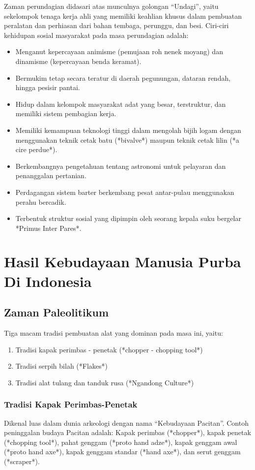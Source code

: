 \documentclass[12pt, a4paper]{article}
\begin{document}
Zaman perundagian didasari atas munculnya golongan ``Undagi'', yaitu sekelompok tenaga kerja ahli yang memiliki keahlian khusus dalam pembuatan peralatan dan perhiasan dari bahan tembaga, perunggu, dan besi. Ciri-ciri kehidupan sosial masyarakat pada masa perundagian adalah:
\begin{itemize}
	\item Menganut kepercayaan animisme (pemujaan roh nenek moyang) dan dinamisme (kepercayaan benda keramat).
	\item Bermukim tetap secara teratur di daerah pegunungan, dataran rendah, hingga pesisir pantai.
	\item Hidup dalam kelompok masyarakat adat yang besar, terstruktur, dan memiliki sistem pembagian kerja.
	\item Memiliki kemampuan teknologi tinggi dalam mengolah bijih logam dengan menggunakan teknik cetak batu (*bivalve*) maupun teknik cetak lilin (*a cire perdue*).
	\item Berkembangnya pengetahuan tentang astronomi untuk pelayaran dan penanggalan pertanian.
	\item Perdagangan sistem barter berkembang pesat antar-pulau menggunakan perahu bercadik.
	\item Terbentuk struktur sosial yang dipimpin oleh seorang kepala suku bergelar *Primus Inter Pares*.
\end{itemize}

\section{Hasil Kebudayaan Manusia Purba Di Indonesia}
\subsection{Zaman Paleolitikum}
Tiga macam tradisi pembuatan alat yang dominan pada masa ini, yaitu:
\begin{enumerate}
	\item Tradisi kapak perimbas - penetak (*chopper - chopping tool*)
	\item Tradisi serpih bilah (*Flakes*)
	\item Tradisi alat tulang dan tanduk rusa (*Ngandong Culture*)
\end{enumerate}
\subsubsection{Tradisi Kapak Perimbas-Penetak}
Dikenal luas dalam dunia arkeologi dengan nama ``Kebudayaan Pacitan''. Contoh peninggalan budaya Pacitan adalah: Kapak perimbas (*chopper*), kapak penetak (*chopping tool*), pahat genggam (*proto hand adze*), kapak genggam awal (*proto hand axe*), kapak genggam standar (*hand axe*), dan serut genggam (*scraper*).
\end{document}
